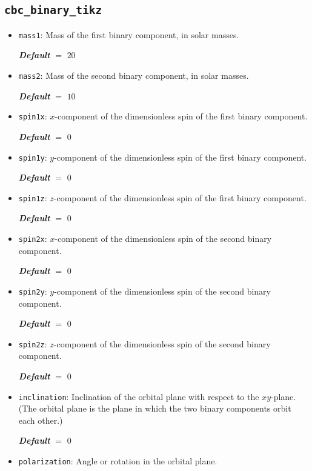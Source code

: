 \documentclass[
    DIV=11,
    BCOR=0mm,
    paper=a4,
    fontsize=11pt,
    twoside=false,
    titlepage=true
]{scrartcl}
\newcommand{\code}[1]{\textcolor{codecolor}{\texttt{#1}}}
\newcommand{\defaultval}[1]{%
    {\bfseries\slshape%
    Default} $=$ #1%
}
\begin{document}
        \subsection{\texttt{cbc\_binary\_tikz}}
\begin{itemize}
    \item \code{mass1}: Mass of the first binary component, in solar masses.
    
    \defaultval{$20$}


    \item \code{mass2}: Mass of the second binary component, in solar masses.
    
    \defaultval{$10$}


    \item \code{spin1x}: $x$-component of the dimensionless spin of the first binary component.
    
    \defaultval{$0$}


    \item \code{spin1y}: $y$-component of the dimensionless spin of the first binary component.
    
    \defaultval{$0$}


    \item \code{spin1z}: $z$-component of the dimensionless spin of the first binary component.
    
    \defaultval{$0$}


    \item \code{spin2x}: $x$-component of the dimensionless spin of the second binary component.
    
    \defaultval{$0$}


    \item \code{spin2y}: $y$-component of the dimensionless spin of the second binary component.
    
    \defaultval{$0$}


    \item \code{spin2z}: $z$-component of the dimensionless spin of the second binary component.
    
    \defaultval{$0$}


	\item \code{inclination}: Inclination of the orbital plane with respect to the $xy$-plane. (The orbital plane is the plane in which the two binary components orbit each other.)
	
    \defaultval{$0$}


	\item \code{polarization}: Angle or rotation in the orbital plane.
	

\end{itemize}
\end{document}
